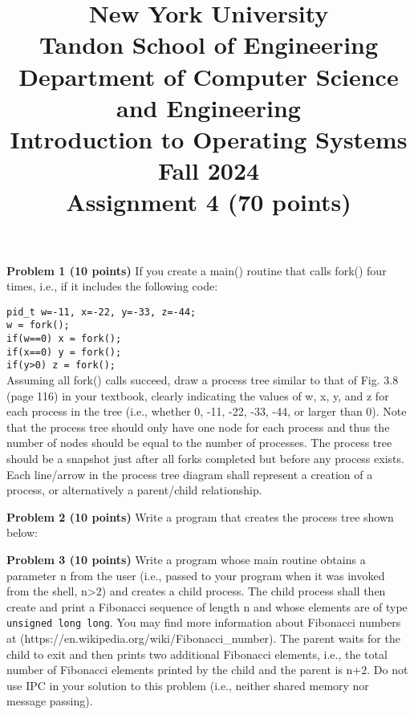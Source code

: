 \documentclass{article}
\begin{document}
\title{New York University \\ Tandon School of Engineering \\ Department of Computer Science and Engineering \\ Introduction to Operating Systems \\ Fall 2024 \\ Assignment 4 (70 points)}
\date{}
\maketitle

\textbf{Problem 1 (10 points)} If you create a main() routine that calls fork() four times, i.e., if it includes the following code:

\texttt{pid\_t w=-11, x=-22, y=-33, z=-44;}\\
\texttt{w = fork();}\\
\texttt{if(w==0) x = fork();}\\
\texttt{if(x==0) y = fork();}\\
\texttt{if(y>0) z = fork();}\\

Assuming all fork() calls succeed, draw a process tree similar to that of Fig. 3.8 (page 116) in your textbook, clearly indicating the values of w, x, y, and z for each process in the tree (i.e., whether 0, -11, -22, -33, -44, or larger than 0). Note that the process tree should only have one node for each process and thus the number of nodes should be equal to the number of processes. The process tree should be a snapshot just after all forks completed but before any process exists. Each line/arrow in the process tree diagram shall represent a creation of a process, or alternatively a parent/child relationship.



\textbf{Problem 2 (10 points)} Write a program that creates the process tree shown below:



\textbf{Problem 3 (10 points)} Write a program whose main routine obtains a parameter n from the user (i.e., passed to your program when it was invoked from the shell, n>2) and creates a child process. The child process shall then create and print a Fibonacci sequence of length n and whose elements are of type \texttt{unsigned long long}. You may find more information about Fibonacci numbers at (https://en.wikipedia.org/wiki/Fibonacci\_number). The parent waits for the child to exit and then prints two additional Fibonacci elements, i.e., the total number of Fibonacci elements printed by the child and the parent is n+2. Do not use IPC in your solution to this problem (i.e., neither shared memory nor message passing).
\end{document}

